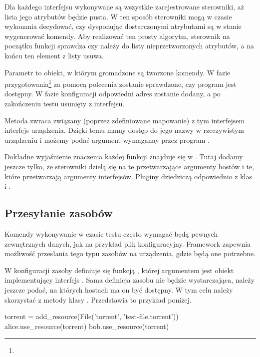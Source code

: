 \documentclass[00-praca-magisterska.tex]{subfiles}
\begin{document}
Dla każdego interfejsu wykonywane są wszystkie zarejestrowane sterowniki, aż
lista jego atrybutów będzie pusta. W ten sposób sterowniki mogą w czasie
wykonania decydować, czy dysponując dostarczonymi atrybutami są w stanie
wygenerować komendy. Aby realizować ten prosty algorytm, sterownik na początku
funkcji  sprawdza czy  należy do listy
nieprzetworzonych atrybutów, a na końcu ten element z listy usuwa.

Parametr  to obiekt, w którym gromadzone są tworzone komendy. W fazie
przygotowania\footnote{} za pomocą polecenia 
zostanie sprawdzone, czy program  jest dostępny. W fazie konfiguracji
odpowiedni adres zostanie dodany, a po zakończeniu testu usunięty z interfejsu.

Metoda  zwraca związany (poprzez zdefiniowane
mapowanie) z tym interfejsem interfejs urządzenia. Dzięki temu mamy dostęp do
jego nazwy w rzeczywistym urządzeniu i możemy podać argument wymaganay przez
program .

Dokładne wyjaśnienie znaczenia każdej funkcji znajduje się w . Tutaj dodamy jeszcze tylko, że sterowniki dzielą się na te
przetwarzające argumenty hostów i te, które przetwarzają argumenty interfejsów.
Pluginy dziedziczą odpowiednio z klas  i
.

\subsection{Przesyłanie zasobów}

Komendy wykonywanie w czasie testu często wymagać będą pewnych zewnętrznych
danych, jak na przykład plik konfiguracyjny. Framework zapewnia możliwość
przesłania tego typu zasobów na urządzenia, gdzie będą one potrzebne.

W konfiguracji zasoby definiuje się funkcją , której
argumentem jest obiekt implementujący interfejs . Sama definicja
zasobu nie będzie wystarczająca, należy jeszcze podać, na których hostach ma on
być dostępny. W tym celu należy skorzystać z metody  klasy
. Przedstawia to przykład poniżej.

\begin{pythoncode}
  torrent = add_resource(File('torrent', 'test-file.torrent'))
  alice.use_resource(torrent)
  bob.use_resource(torrent)
\end{pythoncode}
\end{document}
